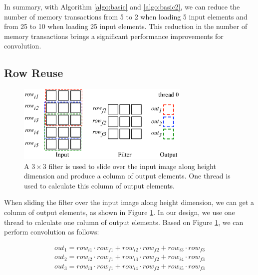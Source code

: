 In summary, with Algorithm \ref{algo:basic} and \ref{algo:basic2}, we can reduce the number of memory transactions from 5 to 2 when loading
5 input elements and from 25 to 10 when loading 25 input elements. This reduction in the number of memory transactions brings a significant
performance improvements for convolution.

\subsection{Row Reuse}
\begin{figure}
	\centering
	\includegraphics[width=\columnwidth,height=3.7cm]{./figure/rowreuse.eps}
\caption{A $3 \times 3$ filter is used to slide over the input image along height dimension and produce a column of output elements. One thread is used to calculate this column of output elements.}
\label{fig:rowreuse}
\end{figure}

When sliding the filter over the input image along height dimension, we can get a column of output elements, as shown in Figure
\ref{fig:rowreuse}. In our design, we use one thread to calculate one column of output elements. Based on Figure \ref{fig:rowreuse},
we can perform convolution as follows:

\begin{gather*}
  out_1=row_{i1} \cdot row_{f1} + row_{i2} \cdot row_{f2} + row_{i3} \cdot row_{f3} \\
out_{2}=row_{i2} \cdot row_{f1} + row_{i3} \cdot row_{f2} + row_{i4} \cdot row_{f3} \\
	out_{3}=row_{i3} \cdot row_{f1} + row_{i4} \cdot row_{f2} + row_{i5} \cdot row_{f3}
\end{gather*}

